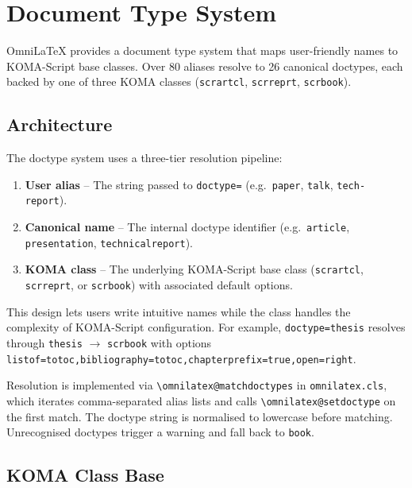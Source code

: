\chapter{Document Type System}
\label{ch:doctype-system}

OmniLaTeX provides a document type system that maps user-friendly names to
KOMA-Script base classes.  Over 80 aliases resolve to 26 canonical
doctypes, each backed by one of three KOMA classes
(\texttt{scrartcl}, \texttt{scrreprt}, \texttt{scrbook}).

\section{Architecture}

The doctype system uses a three-tier resolution pipeline:

\begin{enumerate}
    \item \textbf{User alias} -- The string passed to
          \texttt{doctype=} (e.g.\ \texttt{paper}, \texttt{talk},
          \texttt{tech-report}).
    \item \textbf{Canonical name} -- The internal doctype identifier
          (e.g.\ \texttt{article}, \texttt{presentation},
          \texttt{technicalreport}).
    \item \textbf{KOMA class} -- The underlying KOMA-Script base class
          (\texttt{scrartcl}, \texttt{scrreprt}, or \texttt{scrbook})
          with associated default options.
\end{enumerate}

This design lets users write intuitive names while the class handles the
complexity of KOMA-Script configuration.  For example,
\texttt{doctype=thesis} resolves through \texttt{thesis} $\to$
\texttt{scrbook} with options
\texttt{listof=totoc,bibliography=totoc,chapterprefix=true,open=right}.

Resolution is implemented via \texttt{\textbackslash omnilatex@matchdoctypes}
in \texttt{omnilatex.cls}, which iterates comma-separated alias lists and
calls \texttt{\textbackslash omnilatex@setdoctype} on the first match.
The doctype string is normalised to lowercase before matching.
Unrecognised doctypes trigger a warning and fall back to \texttt{book}.

\section{KOMA Class Base}

